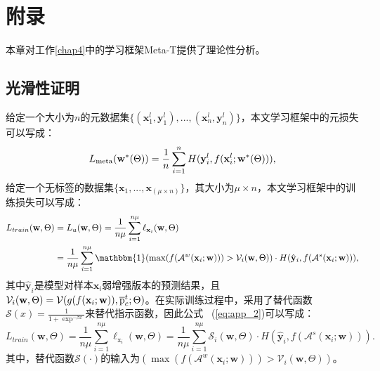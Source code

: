 \chapter{附录}
\label{chap6}

本章对工作\ref{chap4}中的学习框架Meta-T提供了理论性分析。

\section{光滑性证明}
\label{chap6_1}

给定一个大小为$n$的元数据集$\{(\mathbf{x}_1^l, \mathbf{y}_1^l),...,(\mathbf{x}_n^l, \mathbf{y}_n^l)\}$，本文学习框架中的元损失可以写成：
\begin{equation}
    \label{eq:app_1}
         L_{\rm meta}(\mathbf{w}^*({\Theta}))  =
     \frac{1}{n} \sum\limits_{i=1}^n H(\mathbf{y}_i^l, f(\mathbf{x}_i^l; \mathbf{w}^*({\Theta}))),
\end{equation}
给定一个无标签的数据集$\{\mathbf{x}_1,...,\mathbf{x}_{(\mu \times n)}\}$，其大小为$\mu \times n$，本文学习框架中的训练损失可以写成：
\begin{equation}
    \begin{aligned}
        \label{eq:app_2}
        L_{train}(\mathbf{w},\Theta) &= L_u(\mathbf{w},\Theta) = 
        \frac{1}{n\mu} \sum\limits_{i=1}^{n\mu} \ell_{\mathbf{x}_i}(\mathbf{w}, \Theta) \\ &=
        \frac{1}{n\mu} \sum\limits_{i=1}^{n\mu} \mathbbm{1}(\max(f(\mathcal{A}^w(\mathbf{x}_i; \mathbf{w}))) > \mathcal{V}_i(\mathbf{w}, \Theta))  \cdot   H(\hat{\mathbf{y}}_i, f(\mathcal{A}^s(\mathbf{x}_i; \mathbf{w}))),
    \end{aligned}
\end{equation}
其中$\mathbf{\hat y}_i$是模型对样本$\mathbf{x}_i$弱增强版本的预测结果，且$\mathcal{V}_i(\mathbf{w}, \Theta) = \mathcal{V}(g(f(\mathbf{x}_i; \mathbf{w})), \overline {\rm p}_c^t; \Theta)$。在实际训练过程中，采用了替代函数$\mathcal{S}(x) = \frac{1}{1 + \exp^{- \beta x}}$来替代指示函数，因此公式 ~(\ref{eq:app_2})可以写成：
\begin{equation}
    \label{eq:app_2new}
    L_{train}(\mathbf{w},\Theta) = \frac{1}{n\mu} \sum\limits_{i=1}^{n\mu} \ell_{\mathrm{x}_i}(\mathbf{w}, \Theta) =
    \frac{1}{n\mu} \sum\limits_{i=1}^{n\mu} \mathcal{S}_i(\mathbf{w}, \Theta) \cdot   H(\hat{\mathbf{y}}_i, f(\mathcal{A}^s(\mathbf{x}_i; \mathbf{w}))).
\end{equation}
其中，替代函数$\mathcal{S}(\cdot)$的输入为$(\max(f(\mathcal{A}^w(\mathbf{x}_i; \mathbf{w}))) > \mathcal{V}_i(\mathbf{w}, \Theta))$。

